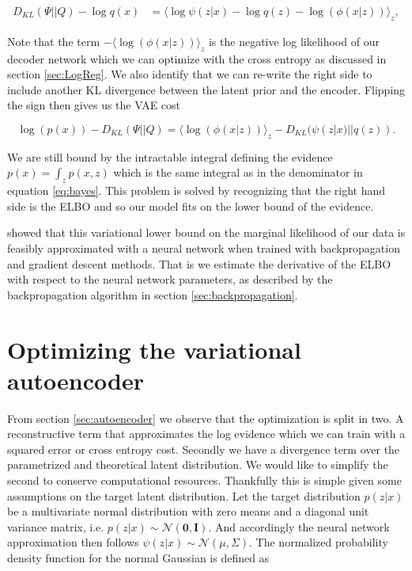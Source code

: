 \begin{align}
D_{KL}(\Psi || Q ) - \log q(x) &=  \langle \log \psi(z|x) - \log q(z) - \log \left( \phi( x | z)\right) \rangle_z, 
\end{align}

\noindent Note that the term $-\langle \log \left( \phi( x | z)\right) \rangle_z$ is the negative log likelihood of our decoder network which we can optimize with the cross entropy as discussed in section \ref{sec:LogReg}. We also identify that we can re-write the right side to include another KL divergence between the latent prior and the encoder. Flipping the sign then gives us the VAE cost

\begin{equation}\label{eq:vae_cost}
\log(p(x)) - D_{KL}(\Psi || Q )=  \langle \log \left( \phi( x | z)\right) \rangle_z - D_{KL}(\psi(z|x)|| q(z)).
\end{equation}
 
\noindent We are still bound by the intractable integral defining the evidence $p(x) = \int_z p(x, z)$ which is the same integral as in the denominator in equation \ref{eq:bayes}. This problem is solved by recognizing that the right hand side is the ELBO and so our model fits on the lower bound of the evidence.

\citet{Kingma2013} showed that this variational lower bound on the marginal likelihood of our data is feasibly approximated with a neural network when trained with backpropagation and gradient descent methods. That is we estimate the derivative of the ELBO with respect to the neural network parameters, as described by the backpropagation algorithm in section \ref{sec:backpropagation}.

\section{Optimizing the variational autoencoder}

From section \ref{sec:autoencoder} we observe that the optimization is split in two. A reconstructive term that approximates the log evidence which we can train with a squared error or cross entropy cost. Secondly we have a divergence term over the parametrized and theoretical latent distribution. We would like to simplify the second to conserve computational resources. Thankfully this is simple given some assumptions on the target latent distribution. Let the target distribution $p(z | x) $ be a multivariate normal distribution with zero means and a diagonal unit variance matrix, i.e. $p(z | x) \sim  \mathcal{N}(\mathbf{0}, \mathbf{I})$. And accordingly the neural network approximation then follows $\psi(z | x) \sim \mathcal{N}(\mu, \Sigma)$. The normalized probability density function for the normal Gaussian is defined as 

